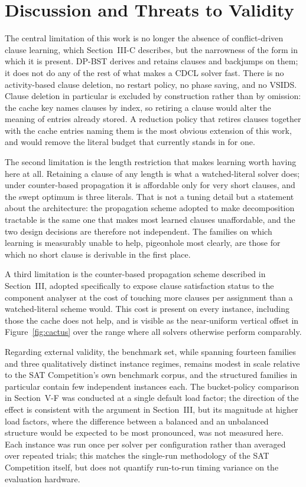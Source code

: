 \documentclass[conference]{IEEEtran}
\begin{document}
\section{Discussion and Threats to Validity}

The central limitation of this work is no longer the absence of conflict-driven clause learning,
which Section~III-C describes, but the narrowness of the form in which it is present. DP-BST
derives and retains clauses and backjumps on them; it does not do any of the rest of what makes a
CDCL solver fast. There is no activity-based clause deletion, no restart policy, no phase saving,
and no VSIDS. Clause deletion in particular is excluded by construction rather than by omission:
the cache key names clauses by index, so retiring a clause would alter the meaning of entries
already stored. A reduction policy that retires clauses together with the cache entries naming
them is the most obvious extension of this work, and would remove the literal budget that
currently stands in for one.

The second limitation is the length restriction that makes learning worth having here at all.
Retaining a clause of any length is what a watched-literal solver does; under counter-based
propagation it is affordable only for very short clauses, and the swept optimum is three literals.
That is not a tuning detail but a statement about the architecture: the propagation scheme adopted
to make decomposition tractable is the same one that makes most learned clauses unaffordable, and
the two design decisions are therefore not independent. The families on which learning is
measurably unable to help, pigeonhole most clearly, are those for which no short clause is
derivable in the first place.

A third limitation is the counter-based propagation scheme described in Section~III, adopted
specifically to expose clause satisfaction status to the component analyser at the cost of
touching more clauses per assignment than a watched-literal scheme would. This cost is present on
every instance, including those the cache does not help, and is visible as the near-uniform
vertical offset in Figure~\ref{fig:cactus} over the range where all solvers otherwise perform
comparably.

Regarding external validity, the benchmark set, while spanning fourteen families and three
qualitatively distinct instance regimes, remains modest in scale relative to the SAT Competition's
own benchmark corpus, and the structured families in particular contain few independent instances
each. The bucket-policy comparison in Section~V-F was conducted at a single default load factor;
the direction of the effect is consistent with the argument in Section~III, but its magnitude at
higher load factors, where the difference between a balanced and an unbalanced structure would be
expected to be most pronounced, was not measured here. Each instance was run once per solver per
configuration rather than averaged over repeated trials; this matches the single-run methodology
of the SAT Competition itself, but does not quantify run-to-run timing variance on the evaluation
hardware.
\end{document}
